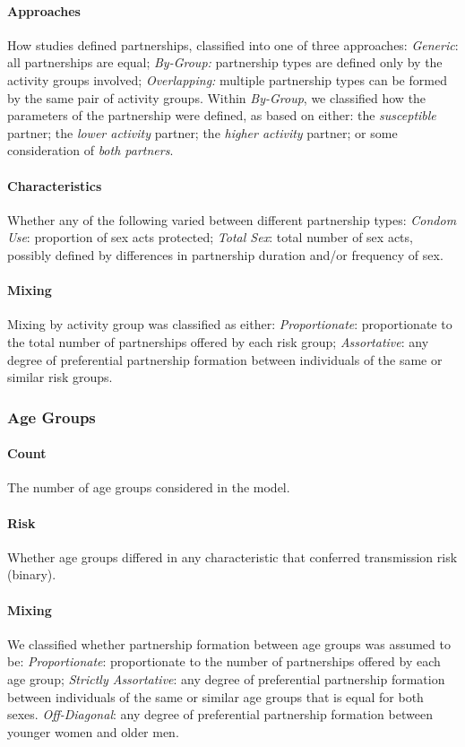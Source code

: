 \paragraph{Approaches}
How studies defined partnerships, classified into one of three approaches:
\emph{Generic}: all partnerships are equal;
\emph{By-Group:} partnership types are defined only by the activity groups involved;
\emph{Overlapping:} multiple partnership types can be formed by the same pair of activity groups.
Within \emph{By-Group}, we classified how the parameters of the partnership were defined, as based on either:
the \emph{susceptible} partner;
the \emph{lower activity} partner;
the \emph{higher activity} partner; or
some consideration of \emph{both partners}.
\paragraph{Characteristics}
Whether any of the following varied between different partnership types:
\emph{Condom Use}: proportion of sex acts protected;
\emph{Total Sex}: total number of sex acts, possibly defined by differences in
partnership duration and/or frequency of sex.
\paragraph{Mixing}
Mixing by activity group was classified as either:
\emph{Proportionate}: proportionate to the total number of partnerships offered by each risk group;
\emph{Assortative}: any degree of preferential partnership formation between
individuals of the same or similar risk groups.
\subsubsection{Age Groups}
\label{aaa:defs:age}
\paragraph{Count}
The number of age groups considered in the model.
\paragraph{Risk}
Whether age groups differed in any characteristic that conferred transmission risk (binary).
\paragraph{Mixing}
We classified whether partnership formation between age groups was assumed to be:
\emph{Proportionate}: proportionate to the number of partnerships offered by each age group;
\emph{Strictly Assortative}: any degree of preferential partnership formation between
individuals of the same or similar age groups that is equal for both sexes.
\emph{Off-Diagonal}: any degree of preferential partnership formation between younger women and older men.
